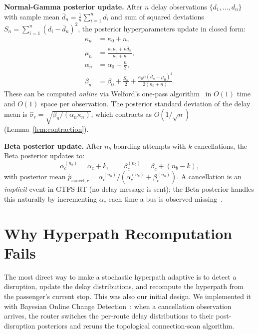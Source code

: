 \documentclass[opre,dblanonrev]{informs4}
\begin{document}
\textbf{Normal-Gamma posterior update.}
After $n$ delay observations $\{d_1, \ldots, d_n\}$ with sample mean
$\bar{d}_n = \tfrac{1}{n}\sum_{i=1}^n d_i$ and
sum of squared deviations $S_n = \sum_{i=1}^n(d_i - \bar{d}_n)^2$,
the posterior hyperparameters update in closed form:
\begin{align}
    \kappa_n &= \kappa_0 + n, \label{eq:ng_kappa}\\
    \mu_n    &= \frac{\kappa_0\mu_0 + n\bar{d}_n}{\kappa_0 + n}, \label{eq:ng_mu}\\
    \alpha_n &= \alpha_0 + \tfrac{n}{2}, \label{eq:ng_alpha}\\
    \beta_n  &= \beta_0 + \tfrac{S_n}{2}
               + \frac{\kappa_0 n(\bar{d}_n - \mu_0)^2}{2(\kappa_0+n)}.
               \label{eq:ng_beta}
\end{align}
These can be computed \emph{online} via Welford's one-pass algorithm~\citep{welford1962}
in $O(1)$ time and $O(1)$ space per observation.
The posterior standard deviation of the delay mean is
$\hat\sigma_r = \sqrt{\beta_n / (\alpha_n\kappa_n)}$,
which contracts as $O(1/\sqrt{n})$ (Lemma~\ref{lem:contraction}).

\textbf{Beta posterior update.}
After $n_b$ boarding attempts with $k$ cancellations, the Beta posterior updates to:
\begin{equation}
    \alpha_c^{(n_b)} = \alpha_c + k, \qquad
    \beta_c^{(n_b)} = \beta_c + (n_b - k),
    \label{eq:beta_update}
\end{equation}
with posterior mean
$\hat{p}_{\mathrm{cancel},r} = \alpha_c^{(n_b)}/(\alpha_c^{(n_b)} + \beta_c^{(n_b)})$.
A cancellation is an \emph{implicit} event in GTFS-RT (no delay message is sent);
the Beta posterior handles this naturally by incrementing $\alpha_c$ each time
a bus is observed missing~\citep{adams2007}.

\section{Why Hyperpath Recomputation Fails}
\label{sec:recomp}

The most direct way to make a stochastic hyperpath adaptive is to
detect a disruption, update the delay distributions, and recompute
the hyperpath from the passenger's current stop. This was also our
initial design. We implemented it with Bayesian Online Change
Detection~\citep{adams2007}: when a cancellation observation arrives,
the router switches the per-route delay distributions to their
post-disruption posteriors and reruns the topological connection-scan
algorithm.
\end{document}
